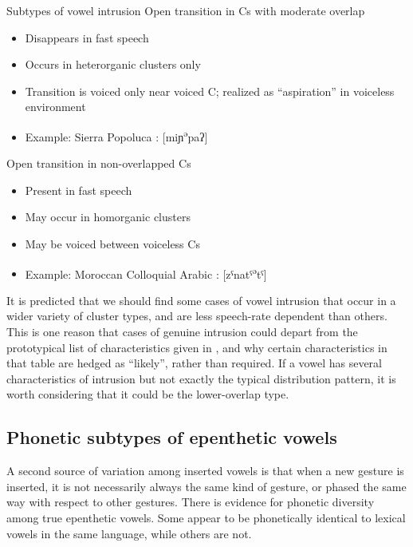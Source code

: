 \documentclass[output=paper,colorlinks,citecolor=brown]{langscibook}
\begin{document}
\ea Subtypes of vowel intrusion\label{subtypes}
\ea Open transition in Cs with moderate overlap
\begin{itemize}
    \item Disappears in fast speech
    \item Occurs in heterorganic clusters only
    \item Transition is voiced only near voiced C; realized as “aspiration” in voiceless environment
    \item Example: Sierra Popoluca \citep{Gafos2002}: [miɲ\textsuperscript{ə}paʔ]
\end{itemize}
\ex Open transition in non-overlapped Cs
\begin{itemize}
    \item Present in fast speech
    \item May occur in homorganic clusters
    \item May be voiced between voiceless Cs
    \item Example: Moroccan Colloquial Arabic \citep{Gafos2002}: [zˤnatˤ\textsuperscript{ə}tˤ]
\end{itemize}                                        
\z
\z


It is predicted that we should find some cases of vowel intrusion that occur in a wider variety of cluster types, and are less speech-rate dependent than others. This is one reason that cases of genuine intrusion could depart from the prototypical list of characteristics given in , and why certain characteristics in that table are hedged as “likely”, rather than required. If a vowel has several characteristics of intrusion but not exactly the typical distribution pattern, it is worth considering that it could be the lower-overlap type. 

\subsection{Phonetic subtypes of epenthetic vowels}\label{sec4_2}

A second source of variation among inserted vowels is that when a new gesture is inserted, it is not necessarily always the same kind of gesture, or phased the same way with respect to other gestures. There is evidence for phonetic diversity among true epenthetic vowels. Some appear to be phonetically identical to lexical vowels in the same language, while others are not. 
\end{document}
